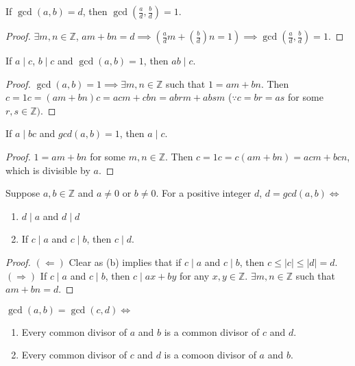 \documentclass{article}
\begin{document}
\begin{multicols}{2}
\begin{mycorollary}
If $\gcd(a,b)=d$, then $\gcd(\frac{a}{d},\frac{b}{d})=1$.
\end{mycorollary}
\begin{proof}
$\exists m,n\in \mathbb{Z}$, $am+bn=d \implies (\frac{a}{d}m+(\frac{b}{d})n=1) \implies \gcd(\frac{a}{d},\frac{b}{d})=1$.
\end{proof}

\begin{mycorollary}
If $a\mid c$, $b\mid c$ and $\gcd(a,b)=1$, then $ab\mid c$.
\end{mycorollary}
\begin{proof}
$\gcd(a,b)=1 \implies \exists m,n\in \mathbb{Z}$ such that $1=am+bn$. Then $c=1c=(am+bn)c=acm+cbn=abrm+absm$ ($\because c=br=as$ for some $r,s\in \mathbb{Z})$.
\end{proof}

\begin{mytheorem}
If $a\mid bc$ and $gcd(a,b)=1$, then $a\mid c$.
\end{mytheorem}
\begin{proof}
$1=am+bn$ for some $m,n\in \mathbb{Z}$. Then $c=1c= c(am+bn)=acm+bcn$, which is divisible by $a$.
\end{proof}

\begin{mytheorem}
Suppose $a,b\in \mathbb{Z}$ and $a\neq 0$ or $b\neq 0$. For a positive integer $d$, $d=gcd(a,b) \iff$
\begin{enumerate}[label={(\alph*)}]
\item $d\mid a$ and $d\mid d$
\item If $c\mid a$ and $c\mid b$, then $c\mid d$.
\end{enumerate}
\end{mytheorem}
\begin{proof}
$(\Leftarrow)$ Clear as (b) implies that if $c\mid a$ and $c\mid b$, then $c\leq |c|\leq |d|=d$.\\
$(\Rightarrow)$ If $c\mid a$ and $c\mid b$, then $c\mid ax+by$ for any $x,y\in \mathbb{Z}$. $\exists m,n\in \mathbb{Z}$ such that $am+bn=d$. 
\end{proof}

\begin{remark}
$\gcd(a,b)=\gcd(c,d) \iff$
\begin{enumerate}[label={(\alph*)}]
\item Every common divisor of $a$ and $b$ is a common divisor of $c$ and $d$.
\item Every common divisor of $c$ and $d$ is a comoon divisor of $a$ and $b$.
\end{enumerate} 
\end{remark}


\end{multicols}
\end{document}
